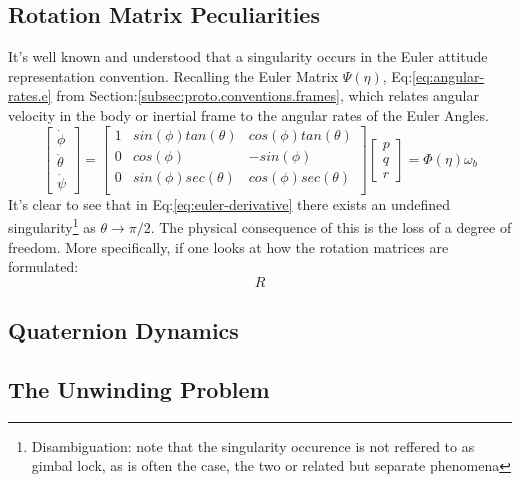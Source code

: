 \subsection{Rotation Matrix Peculiarities}\label{subsec:dynamics.rigidbody.singularity}
It's well known and understood that a singularity occurs in the Euler attitude representation convention. Recalling the Euler Matrix $\Psi(\eta)$, Eq:\ref{eq:angular-rates.e} from Section:\ref{subsec:proto.conventions.frames}, which relates angular velocity in the body or inertial frame to the angular rates of the Euler Angles.
\begin{equation}\label{eq:euler-derivative}
\begin{bmatrix}
\dot{\phi}\\
\dot{\theta}\\
\dot{\psi}
\end{bmatrix}
=\begin{bmatrix}
1 & sin(\phi)tan(\theta) & cos(\phi)tan(\theta)\\
0 & cos(\phi) & -sin(\phi)\\
0 & sin(\phi)sec(\theta) & cos(\phi)sec(\theta)\\
\end{bmatrix}
\begin{bmatrix}
p\\
q\\
r
\end{bmatrix}
=\Phi(\eta)\omega_b
\end{equation}
\newpage
It's clear to see that in Eq:\ref{eq:euler-derivative} there exists an undefined singularity\footnote{Disambiguation: note that the singularity occurence is not reffered to as gimbal lock, as is often the case, the two or related but separate phenomena} as $\theta\rightarrow\pi/2$. The physical consequence of this is the loss of a degree of freedom. More specifically, if one looks at how the rotation matrices are formulated:
\begin{equation}
R
\end{equation}
\subsection{Quaternion Dynamics}
\label{subsec:dynamics.rigidbody.quaternion}
\subsection{The Unwinding Problem}
\label{subsec:dynamics.rigidbody.unwinding}


